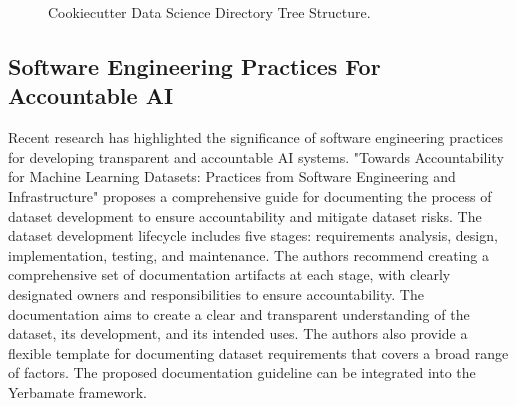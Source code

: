 \begin{figure}
    \centering
    \caption{Cookiecutter Data Science Directory Tree Structure.}
    \label{fig:directory-tree}
\end{figure}



\subsection{Software Engineering Practices For Accountable AI}

Recent research has highlighted the significance of software engineering practices for developing transparent and accountable AI systems. "Towards Accountability for Machine Learning Datasets: Practices from Software Engineering and Infrastructure" proposes a comprehensive guide for documenting the process of dataset development to ensure accountability and mitigate dataset risks. The dataset development lifecycle includes five stages: requirements analysis, design, implementation, testing, and maintenance. The authors recommend creating a comprehensive set of documentation artifacts at each stage, with clearly designated owners and responsibilities to ensure accountability. The documentation aims to create a clear and transparent understanding of the dataset, its development, and its intended uses. The authors also provide a flexible template for documenting dataset requirements that covers a broad range of factors. The proposed documentation guideline can be integrated into the Yerbamate framework.

